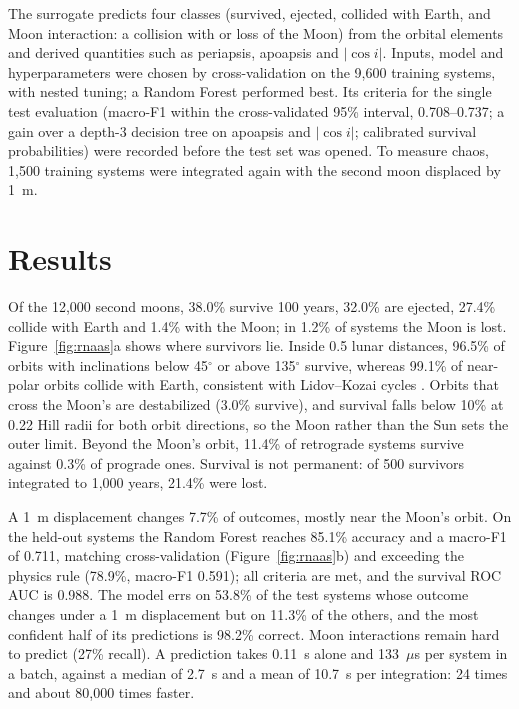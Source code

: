 \documentclass[RNAAS]{aastex631}
\begin{document}
The surrogate predicts four classes (survived, ejected, collided with Earth, and Moon interaction:
a collision with or loss of the Moon) from the orbital elements and derived quantities such as
periapsis, apoapsis and $|\cos i|$. Inputs, model and hyperparameters were chosen by
cross-validation on the 9,600 training systems, with nested tuning; a Random Forest
\citep{Breiman2001, Pedregosa2011} performed best. Its criteria for the single test evaluation
(macro-F1 within the cross-validated 95\% interval, 0.708--0.737; a gain over a depth-3 decision
tree on apoapsis and $|\cos i|$; calibrated survival probabilities) were recorded before the test
set was opened. To measure chaos, 1,500 training systems were integrated again with the second
moon displaced by 1~m.

\section{Results}

Of the 12,000 second moons, 38.0\% survive 100 years, 32.0\% are ejected, 27.4\% collide with
Earth and 1.4\% with the Moon; in 1.2\% of systems the Moon is lost. Figure~\ref{fig:rnaas}a shows
where survivors lie. Inside 0.5 lunar distances, 96.5\% of orbits with inclinations below
45$^\circ$ or above 135$^\circ$ survive, whereas 99.1\% of near-polar orbits collide with Earth,
consistent with Lidov--Kozai cycles \citep{Kozai1962, Lidov1962}. Orbits that cross the Moon's are
destabilized (3.0\% survive), and survival falls below 10\% at 0.22 Hill radii for both orbit
directions, so the Moon rather than the Sun sets the outer limit. Beyond the Moon's orbit, 11.4\% of
retrograde systems survive against 0.3\% of prograde ones. Survival is not permanent: of 500
survivors integrated to 1,000 years, 21.4\% were lost.

A 1~m displacement changes 7.7\% of outcomes, mostly near the Moon's orbit. On the held-out systems
the Random Forest reaches 85.1\% accuracy and a macro-F1 of 0.711, matching cross-validation
(Figure~\ref{fig:rnaas}b) and exceeding the physics rule (78.9\%, macro-F1 0.591); all criteria
are met, and the survival ROC AUC is 0.988. The model errs on 53.8\% of the test systems whose
outcome changes under a 1~m displacement but on 11.3\% of the others, and the most confident half
of its predictions is 98.2\% correct. Moon interactions remain hard to predict (27\% recall). A
prediction takes 0.11~s alone and 133~$\mu$s per system in a batch, against a median of 2.7~s and a
mean of 10.7~s per integration: 24 times and about 80,000 times faster.
\end{document}
